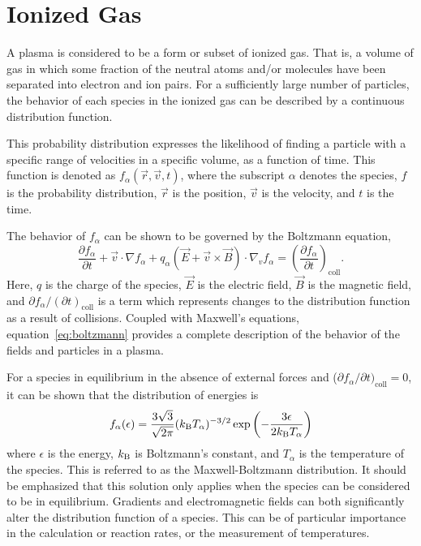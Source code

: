 \section{Ionized Gas}
A plasma is considered to be a form or subset of ionized gas. That is, a volume
of gas in which some fraction of the neutral atoms and/or molecules have been
separated into electron and ion pairs. For a sufficiently large number of
particles, the behavior of each species in the ionized gas can be described by a
continuous distribution function.

This probability distribution expresses the likelihood of finding a particle
with a specific range of velocities in a specific volume, as a function of time.
This function is denoted as $f_\alpha(\vec{r}, \vec{v}, t)$, where
the subscript $\alpha$ denotes the species, $f$ is the probability distribution,
$\vec{r}$ is the position, $\vec{v}$ is the velocity, and $t$ is the time.

The behavior of $f_\alpha$ can be shown to be governed by the Boltzmann
equation,
\begin{equation}\label{eq:boltzmann}
  \frac{\partial f_\alpha}{\partial t} + \vec{v}\cdot\nabla f_\alpha +
  q_\alpha \left(\vec{E} + \vec{v}\times\vec{B}\right)
  \cdot \nabla_v f_\alpha = \left( \frac{\partial f_\alpha}
  {\partial t}\right)_\mathrm{coll}.
\end{equation}
Here, $q$ is the charge of the species, $\vec{E}$ is the electric field,
$\vec{B}$ is the magnetic field, and $\partial f_\alpha/(\partial
t)_\mathrm{coll}$ is a term which represents changes to the distribution
function as a result of collisions. Coupled with Maxwell's equations,
equation~\ref{eq:boltzmann} provides a complete description of the behavior of
the fields and particles in a plasma.

For a species in equilibrium in the absence of external forces and ($\partial
f_\alpha/\partial t)_\mathrm{coll} = 0$, it can be shown that the distribution
of energies is
\begin{equation}\label{eq:mb}
  f_{\alpha}(\epsilon) = \frac{3\sqrt{3}}{\sqrt{2\pi}}(k_\mathrm{B} T_\alpha)^{-3/2}
                        \exp{\left(-\frac{3\epsilon}{2k_\mathrm{B}T_\alpha}\right)}
\end{equation}
where $\epsilon$ is the energy, $k_\mathrm{B}$ is Boltzmann's constant, and $T_\alpha$ is
the temperature of the species. This is referred to as the Maxwell-Boltzmann
distribution. It should be emphasized that this solution only applies when the
species can be considered to be in equilibrium. Gradients and electromagnetic
fields can both significantly alter the distribution function of a species. This
can be of particular importance in the calculation or reaction rates, or the
measurement of temperatures.

